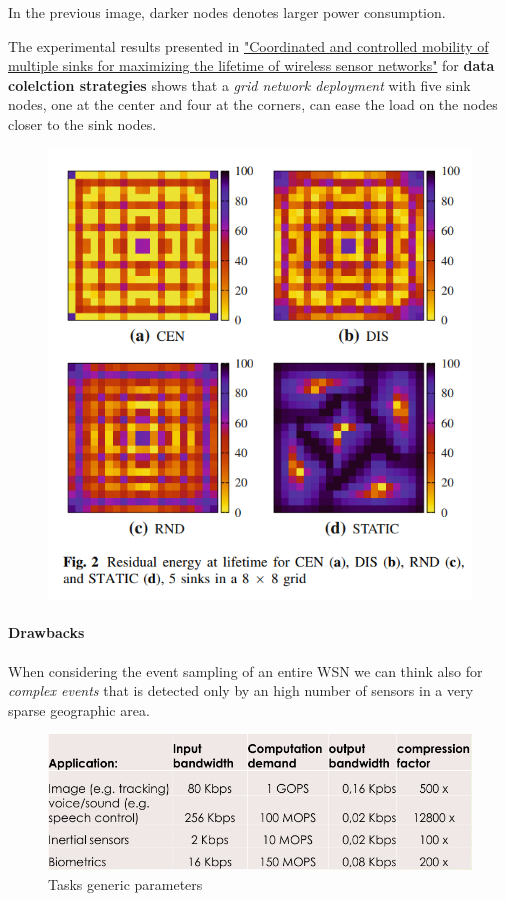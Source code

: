 \documentclass[10pt,a4paper]{report}
\theoremstyle{definition}
\begin{document}
In the previous image, darker nodes denotes larger power consumption.

The experimental results presented in \href{https://doi.org/10.1007/s11276-010-0313-8}{"Coordinated and controlled mobility of multiple sinks for maximizing the lifetime of wireless sensor networks"} for \textbf{data colelction strategies} shows that a \textit{grid network deployment} with five sink nodes, one at the center and four at the corners, can ease the load on the nodes closer to the sink nodes.
\begin{figure}[h]
	\centering\includegraphics[scale=0.30]{images/Pasted image 20230522181333.png}
\end{figure}



\paragraph{Drawbacks}\label{sec:drawbacks}
When considering the event sampling of an entire WSN we can think also for \textit{complex events} that is detected only by an high number of sensors in a very sparse geographic area.
\begin{figure}[h]
	\centering\includegraphics[scale=0.30]{images/Pasted image 20230522182050.png}
	\caption{Tasks generic parameters}
	\label{wsn-application-use-cases}
\end{figure}
\end{document}
